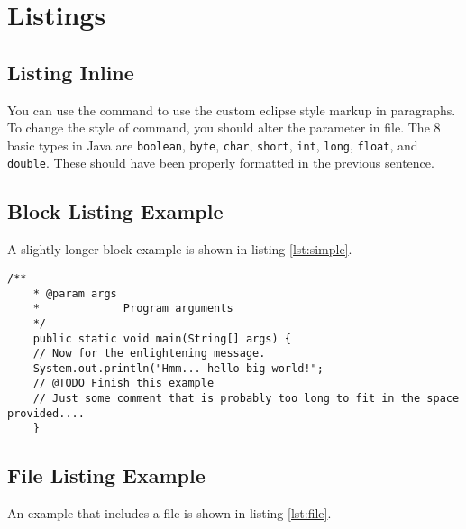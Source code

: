 \section{Listings}


	\subsection*{Listing Inline}
	
	\lstset{breaklines=false}
	
	You can use the  command to use the custom
	eclipse style markup in paragraphs. To change the style of  command, you should alter the parameter  in  file.  The 8 basic types in Java are
	\lstinline$boolean$, \lstinline$byte$, \lstinline$char$,
	\lstinline$short$, \lstinline$int$, \lstinline$long$,
	\lstinline$float$, and \lstinline$double$. These should have been
	properly formatted in the previous sentence.
	
	\lstset{breaklines=true}
	
	\subsection*{Block Listing Example}
	
	A slightly longer block example is shown in listing \ref{lst:simple}.
	
	\begin{lstlisting}[caption={A simple listing.}, label={lst:simple}]
	/**
	* @param args
	*             Program arguments
	*/
	public static void main(String[] args) {
	// Now for the enlightening message.
	System.out.println("Hmm... hello big world!";
	// @TODO Finish this example
	// Just some comment that is probably too long to fit in the space provided....
	}
	\end{lstlisting}
	
	\subsection*{File Listing Example}
	
	An example that includes a  file is shown in listing \ref{lst:file}.
	
	
	
